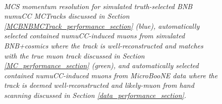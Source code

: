 \begin{figure}
\centering
\mbox{
	\quad
	}
\caption{\textit{MCS momentum resolution for simulated truth-selected BNB numuCC {\sc MCTracks} discussed in Section \ref{MCBNBMCTrack_performance_section} (blue), automatically selected contained numuCC-induced muons from simulated BNB+cosmics where the track is well-reconstructed and matches with the true muon track discussed in Section \ref{MC_performance_section} (green), and automatically selected contained numuCC-induced muons from MicroBooNE data where the track is deemed well-reconstructed and likely-muon from hand scanning discussed in Section \ref{data_performance_section}.}}
\label{MCS_range_bias_resolution_masteroverlay_fig}
\end{figure}











\clearpage
